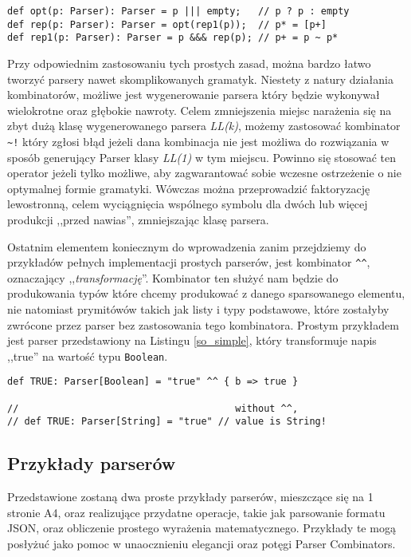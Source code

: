 \begin{lstlisting}[caption={Implementacja parserów opt i rep}, label={optrep}]
def opt(p: Parser): Parser = p ||| empty;   // p ? p : empty
def rep(p: Parser): Parser = opt(rep1(p));  // p* = [p+]
def rep1(p: Parser): Parser = p &&& rep(p); // p+ = p ~ p*
\end{lstlisting}


Przy odpowiednim zastosowaniu tych prostych zasad, można bardzo łatwo tworzyć parsery nawet skomplikowanych gramatyk.
Niestety z natury działania kombinatorów, możliwe jest wygenerowanie parsera który będzie wykonywał wielokrotne oraz głębokie nawroty.
Celem zmniejszenia miejsc narażenia się na zbyt dużą klasę wygenerowanego parsera \textit{LL(k)}, możemy zastosować kombinator \verb|~!|
który zgłosi błąd jeżeli dana kombinacja nie jest możliwa do rozwiązania w sposób generujący Parser klasy \textit{LL(1)} w tym miejscu.
Powinno się stosować ten operator jeżeli tylko możliwe, aby zagwarantować sobie wczesne ostrzeżenie o nie optymalnej formie gramatyki.
Wówczas można przeprowadzić faktoryzację lewostronną, celem wyciągnięcia wspólnego symbolu dla dwóch lub więcej produkcji ,,przed nawias'', zmniejszając klasę parsera.

Ostatnim elementem koniecznym do wprowadzenia zanim przejdziemy do przykładów pełnych implementacji prostych parserów, jest kombinator \verb|^^|,
oznaczający ,,\textit{transformację}''. Kombinator ten służyć nam będzie do produkowania typów które chcemy produkować z danego sparsowanego elementu,
nie natomiast prymitówów takich jak listy i typy podstawowe, które zostałyby zwrócone przez parser bez zastosowania tego kombinatora.
Prostym przykładem jest parser przedstawiony na Listingu \ref{so_simple}, który transformuje napis ,,true'' na wartość typu \verb|Boolean|.

\begin{lstlisting}[caption={Zastosowanie kombinatora transformującego}, label={so_simple}]
def TRUE: Parser[Boolean] = "true" ^^ { b => true }

//                                      without ^^, 
// def TRUE: Parser[String] = "true" // value is String!

\end{lstlisting}

\subsection{Przykłady parserów}
Przedstawione zostaną dwa proste przykłady parserów, mieszczące się na 1 stronie A4, oraz realizujące przydatne operacje, 
takie jak parsowanie formatu JSON, oraz obliczenie prostego wyrażenia matematycznego. Przykłady te mogą posłyżuć jako pomoc w unaocznieniu elegancji
oraz potęgi Parser Combinators.

